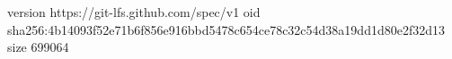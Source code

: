 version https://git-lfs.github.com/spec/v1
oid sha256:4b14093f52e71b6f856e916bbd5478c654ce78c32c54d38a19dd1d80e2f32d13
size 699064
